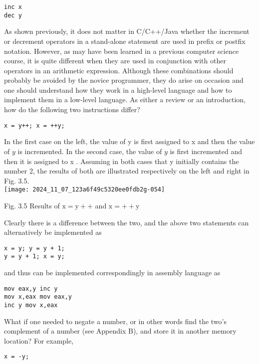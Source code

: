 \documentclass[10pt]{article}
\begin{document}
\begin{verbatim}
inc x
dec y
\end{verbatim}

As shown previously, it does not matter in C/C++/Java whether the increment or decrement operators in a stand-alone statement are used in prefix or postfix notation. However, as may have been learned in a previous computer science course, it is quite different when they are used in conjunction with other operators in an arithmetic expression. Although these combinations should probably be avoided by the novice programmer, they do arise on occasion and one should understand how they work in a high-level language and how to implement them in a low-level language. As either a review or an introduction, how do the following two instructions differ?

\begin{verbatim}
x = y++; x = ++y;
\end{verbatim}

In the first case on the left, the value of y is first assigned to x and then the value of $y$ is incremented. In the second case, the value of $y$ is first incremented and then it is assigned to x . Assuming in both cases that y initially contains the number 2, the results of both are illustrated respectively on the left and right in Fig. 3.5.\\
\texttt{[image: 2024\_11\_07\_123a6f49c5320ee0fdb2g-054]}

Fig. 3.5 Results of $\mathrm{x}=\mathrm{y}++$ and $\mathrm{x}=++\mathrm{y}$

Clearly there is a difference between the two, and the above two statements can alternatively be implemented as

\begin{verbatim}
x = y; y = y + 1;
y = y + 1; x = y;
\end{verbatim}

and thus can be implemented correspondingly in assembly language as

\begin{verbatim}
mov eax,y inc y
mov x,eax mov eax,y
inc y mov x,eax
\end{verbatim}

What if one needed to negate a number, or in other words find the two's complement of a number (see Appendix B), and store it in another memory location? For example,

\begin{verbatim}
x = -y;
\end{verbatim}
\end{document}

